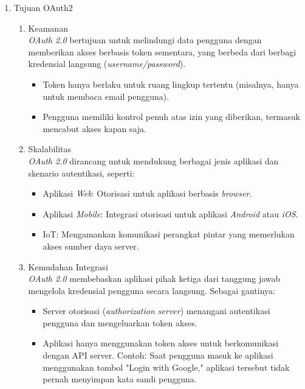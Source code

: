 \begin{enumerate}[label*=\arabic*.,ref=\arabic*]
    \item Tujuan OAuth2
        \begin{enumerate}[label=\alph*.]
            \item Keamanan \\
            \textit{OAuth 2.0} bertujuan untuk melindungi data pengguna dengan memberikan akses berbasis token sementara, yang berbeda dari berbagi kredensial langsung (\textit{username/password}).
                \begin{itemize}
                    \item Token hanya berlaku untuk ruang lingkup tertentu (misalnya, hanya untuk membaca email pengguna).
                    \item Pengguna memiliki kontrol penuh atas izin yang diberikan, termasuk mencabut akses kapan saja.
                \end{itemize}
            \item Skalabilitas \\
            \textit{OAuth 2.0} dirancang untuk mendukung berbagai jenis aplikasi dan skenario autentikasi, seperti:
                \begin{itemize}
                    \item Aplikasi \textit{Web}: Otorisasi untuk aplikasi berbasis \textit{browser}.
                    \item Aplikasi \textit{Mobile}: Integrasi otorisasi untuk aplikasi \textit{Android} atau \textit{iOS}.
                    \item IoT: Mengamankan komunikasi perangkat pintar yang memerlukan akses sumber daya server.
                \end{itemize}
            \item Kemudahan Integrasi \\
            \textit{OAuth 2.0} membebaskan aplikasi pihak ketiga dari tanggung jawab mengelola kredensial pengguna secara langsung. Sebagai gantinya:
                \begin{itemize}
                    \item Server otorisasi (\textit{authorization server}) menangani autentikasi pengguna dan mengeluarkan token akses.
                    \item Aplikasi hanya menggunakan token akses untuk berkomunikasi dengan API server. Contoh: Saat pengguna masuk ke aplikasi menggunakan tombol "Login with Google," aplikasi tersebut tidak pernah menyimpan kata sandi pengguna.
                \end{itemize}
        \end{enumerate}
\end{enumerate}
